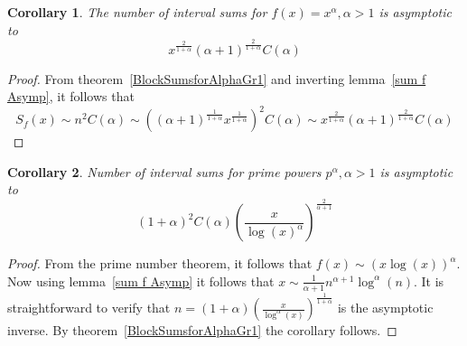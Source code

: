 \documentclass[10pt]{article}
\theoremstyle{plain}
\newtheorem{corollary}{Corollary}
\theoremstyle{definition}
\begin{document}
	
	
	
	
	
	
	\begin{corollary}
		The number of interval sums for $f(x)=x^\alpha, \alpha>1$ is asymptotic to
		\begin{equation}
			x^{\frac{2}{1+\alpha}}(\alpha+1)^{\frac{2}{1+\alpha}}C(\alpha)
		\end{equation}
	\end{corollary}
	\begin{proof}
		From theorem~\ref{BlockSumsforAlphaGr1} and inverting lemma~\ref{sum f Asymp}, it follows that
		\begin{equation}
			S_f(x)\sim n^2C(\alpha)\sim ((\alpha+1)^{\frac{1}{1+\alpha}}x^{\frac{1}{1+\alpha}})^2C(\alpha)\sim x^{\frac{2}{1+\alpha}}(\alpha+1)^{\frac{2}{1+\alpha}}C(\alpha)
		\end{equation}
	\end{proof}
	
	
	
	
	
	
	
	\begin{corollary}
		Number of interval sums for prime powers $p^\alpha, \alpha>1$ is asymptotic to
		\begin{equation}
			(1+\alpha)^2 C(\alpha)\left(\frac{x}{\log(x)^\alpha}\right)^{\frac{2}{\alpha+1}}
		\end{equation}
	\end{corollary}
	\begin{proof}
		From the prime number theorem, it follows that $f(x)\sim(x\log (x))^\alpha$. Now using lemma~\ref{sum f Asymp} it follows that $x\sim \frac{1}{\alpha+1}n^{\alpha+1}\log^\alpha(n)$. It is straightforward to verify that $n=(1+\alpha)\left(\frac{x}{\log^{\alpha}(x)}\right)^{\frac{1}{1+\alpha}}$ is the asymptotic inverse. By theorem~\ref{BlockSumsforAlphaGr1} the corollary follows.
	\end{proof}
	
	
	
	
	
	
	
	
	
	
	
	
	
	
	
	
	
	
	
	
	
	
	
	
	
\end{document}
